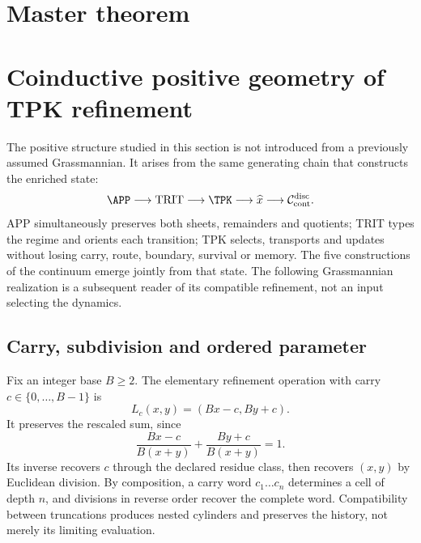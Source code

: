 \section{Master theorem}


\section{Coinductive positive geometry of TPK refinement}
\label{geometria_positiva:sec:geom-positiva-tpk}

The positive structure studied in this section is not introduced from a previously assumed Grassmannian. It arises from the same generating chain that constructs the enriched state:
\[
 \APP\longrightarrow\mathrm{TRIT}\longrightarrow\TPK
 \longrightarrow \widehat x
 \longrightarrow\mathcal C_{\rm cont}^{\rm disc}.
\]
APP simultaneously preserves both sheets, remainders and quotients; TRIT types the regime and orients each transition; TPK selects, transports and updates without losing carry, route, boundary, survival or memory. The five constructions of the continuum emerge jointly from that state. The following Grassmannian realization is a subsequent reader of its compatible refinement, not an input selecting the dynamics.

\subsection{Carry, subdivision and ordered parameter}

Fix an integer base \(B\ge2\). The elementary refinement operation with carry \(c\in\{0,\ldots,B-1\}\) is
\begin{equation}
 L_c(x,y)=(Bx-c,By+c).
 \label{geometria_positiva:eq:carry-map-positive}
\end{equation}
It preserves the rescaled sum, since
\[
 \frac{Bx-c}{B(x+y)}+\frac{By+c}{B(x+y)}=1.
\]
Its inverse recovers \(c\) through the declared residue class, then recovers \((x,y)\) by Euclidean division. By composition, a carry word \(c_1\ldots c_n\) determines a cell of depth \(n\), and divisions in reverse order recover the complete word. Compatibility between truncations produces nested cylinders and preserves the history, not merely its limiting evaluation.

